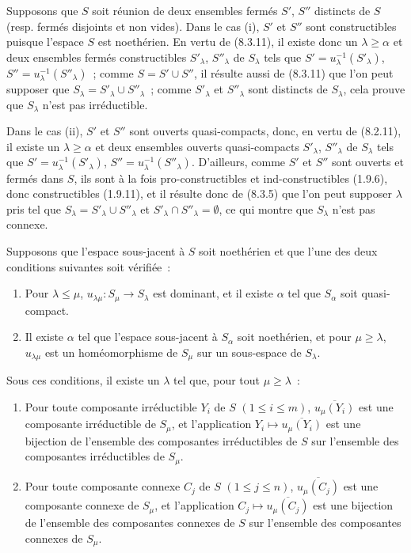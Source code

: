 Supposons que $S$ soit réunion de deux ensembles fermés $S'$, $S''$ distincts
de $S$ (resp. fermés disjoints et non vides). Dans le cas (i), $S'$ et $S''$
sont constructibles puisque l'espace $S$ est noethérien. En vertu de
(8.3.11), il existe donc un $\lambda\geq\alpha$ et deux ensembles fermés
constructibles $S'_\lambda$, $S''_\lambda$ de $S_\lambda$ tels que
$S'=u_\lambda^{-1}(S'_\lambda)$,
$S''=u_\lambda^{-1}(S''_\lambda)$~; comme $S=S'\cup S''$, il résulte aussi
de (8.3.11) que l'on peut supposer que
$S_\lambda=S'_\lambda\cup S''_\lambda$~; comme $S'_\lambda$ et
$S''_\lambda$ sont distincts de $S_\lambda$, cela prouve que $S_\lambda$
n'est pas irréductible.

Dans le cas (ii), $S'$ et $S''$ sont ouverts quasi-compacts, donc, en vertu
de (8.2.11), il existe un $\lambda\geq\alpha$ et deux ensembles ouverts
quasi-compacts $S'_\lambda$, $S''_\lambda$ de $S_\lambda$ tels que
$S'=u_\lambda^{-1}(S'_\lambda)$,
$S''=u_\lambda^{-1}(S''_\lambda)$. D'ailleurs, comme $S'$ et $S''$ sont
ouverts et fermés dans $S$, ils sont à la fois pro-constructibles et
ind-constructibles (1.9.6), donc constructibles (1.9.11), et il résulte donc
de (8.3.5) que l'on peut supposer $\lambda$ pris tel que
$S_\lambda=S'_\lambda\cup S''_\lambda$ et
$S'_\lambda\cap S''_\lambda=\emptyset$, ce qui montre que $S_\lambda$
n'est pas connexe.

\begin{proposition}[8.4.2]
\label{IV.8.4.2-fr}
Supposons que l'espace sous-jacent à $S$ soit noethérien et que l'une des deux
conditions suivantes soit vérifiée~:
\begin{enumerate}
\item[\emph{a)}] Pour $\lambda\leq\mu$,
$u_{\lambda\mu}:S_\mu\to S_\lambda$ est dominant, et il existe $\alpha$ tel
que $S_\alpha$ soit quasi-compact.
\item[\emph{b)}] Il existe $\alpha$ tel que l'espace sous-jacent à
$S_\alpha$ soit noethérien, et pour $\mu\geq\lambda$, $u_{\lambda\mu}$ est
un homéomorphisme de $S_\mu$ sur un sous-espace de $S_\lambda$.
\end{enumerate}
Sous ces conditions, il existe un $\lambda$ tel que, pour tout
$\mu\geq\lambda$~:
\begin{enumerate}
\item[(i)] Pour toute composante irréductible $Y_i$ de $S$
$(1\leq i\leq m)$, $\overline{u_\mu(Y_i)}$ est une composante irréductible
de $S_\mu$, et l'application $Y_i\mapsto\overline{u_\mu(Y_i)}$ est une
bijection de l'ensemble des composantes irréductibles de $S$ sur l'ensemble
des composantes irréductibles de $S_\mu$.
\item[(ii)] Pour toute composante connexe $C_j$ de $S$
$(1\leq j\leq n)$, $\overline{u_\mu(C_j)}$ est une composante connexe de
$S_\mu$, et l'application $C_j\mapsto\overline{u_\mu(C_j)}$ est une
bijection de l'ensemble des composantes connexes de $S$ sur l'ensemble des
composantes connexes de $S_\mu$.
\end{enumerate}
\end{proposition}

